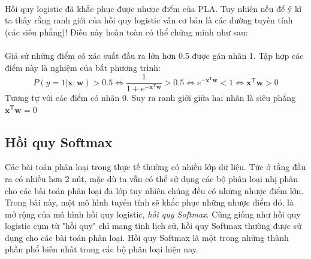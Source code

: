 \documentclass{article}
\begin{document}
\phantom{a}\\
Hồi quy logistic đã khắc phục được nhược điểm của PLA. Tuy nhiên nếu để ý kĩ ta thấy rằng ranh giới của hồi quy logistic vẫn cơ bản là các đường tuyến tính (các siêu phẳng)! Điều này hoàn toàn có thể chứng minh như sau:\\\\
Giả sử những điểm có xác suất đầu ra lớn hơn 0.5 được gán nhãn 1. Tập hợp các điểm này là nghiệm của bất phương trình:
$$P(y=1|\textbf{x};\textbf{w})>0.5 \Leftrightarrow \frac{1}{1+e^{-\textbf{x}^{\text{T}}\textbf{w}}}>0.5 \Leftrightarrow e^{-\textbf{x}^{\text{T}}\textbf{w}}<1\Leftrightarrow \textbf{x}^{\text{T}}\textbf{w}>0$$
Tương tự với các điểm có nhãn 0. Suy ra ranh giới giữa hai nhãn là siêu phẳng $\textbf{x}^{\text{T}}\textbf{w}=0$
\subsection{Hồi quy Softmax}
Các bài toán phân loại trong thực tế thường có nhiều lớp dữ liệu. Tức ở tầng đầu ra có nhiều hơn 2 nút, mặc dù ta vẫn có thể sử dụng các bộ phân loại nhị phân cho các bài toán phân loại đa lớp tuy nhiên chúng đều có những nhược điểm lớn. Trong bài này, một mô hình tuyến tính sẽ khắc phục những nhược điểm đó, là mở rộng của mô hình hồi quy logistic, \textit{hồi quy Softmax}. Cũng giống như hồi quy logistic cụm từ "hồi quy" chỉ mang tính lịch sử, hồi quy Softmax thường được sử dụng cho các bài toán phân loại. Hồi quy Softmax là một trong những thành phần phổ biến nhất trong các bộ phân loại hiện nay.
\end{document}
